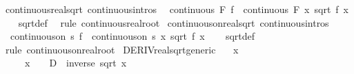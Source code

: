 \begin{isabellebody}
\endisatagproof
{\isafoldproof}%
%
\isadelimproof
\isanewline
%
\endisadelimproof
\isanewline
{}\isamarkupfalse%
\ continuous{\isacharunderscore}{\kern0pt}real{\isacharunderscore}{\kern0pt}sqrt\ {\isacharbrackleft}{\kern0pt}continuous{\isacharunderscore}{\kern0pt}intros{\isacharbrackright}{\kern0pt}{\isacharcolon}{\kern0pt}\isanewline
\ \ {\isachardoublequoteopen}continuous\ F\ f\ {\isasymLongrightarrow}\ continuous\ F\ {\isacharparenleft}{\kern0pt}{\isasymlambda}x{\isachardot}{\kern0pt}\ sqrt\ {\isacharparenleft}{\kern0pt}f\ x{\isacharparenright}{\kern0pt}{\isacharparenright}{\kern0pt}{\isachardoublequoteclose}\isanewline
%
\isadelimproof
\ \ %
\endisadelimproof
%
\isatagproof
{}\isamarkupfalse%
\ sqrt{\isacharunderscore}{\kern0pt}def\ \isamarkupfalse%
\ {\isacharparenleft}{\kern0pt}rule\ continuous{\isacharunderscore}{\kern0pt}real{\isacharunderscore}{\kern0pt}root{\isacharparenright}{\kern0pt}%
\endisatagproof
{\isafoldproof}%
%
\isadelimproof
\isanewline
%
\endisadelimproof
\isanewline
{}\isamarkupfalse%
\ continuous{\isacharunderscore}{\kern0pt}on{\isacharunderscore}{\kern0pt}real{\isacharunderscore}{\kern0pt}sqrt\ {\isacharbrackleft}{\kern0pt}continuous{\isacharunderscore}{\kern0pt}intros{\isacharbrackright}{\kern0pt}{\isacharcolon}{\kern0pt}\isanewline
\ \ {\isachardoublequoteopen}continuous{\isacharunderscore}{\kern0pt}on\ s\ f\ {\isasymLongrightarrow}\ continuous{\isacharunderscore}{\kern0pt}on\ s\ {\isacharparenleft}{\kern0pt}{\isasymlambda}x{\isachardot}{\kern0pt}\ sqrt\ {\isacharparenleft}{\kern0pt}f\ x{\isacharparenright}{\kern0pt}{\isacharparenright}{\kern0pt}{\isachardoublequoteclose}\isanewline
%
\isadelimproof
\ \ %
\endisadelimproof
%
\isatagproof
{}\isamarkupfalse%
\ sqrt{\isacharunderscore}{\kern0pt}def\ \isamarkupfalse%
\ {\isacharparenleft}{\kern0pt}rule\ continuous{\isacharunderscore}{\kern0pt}on{\isacharunderscore}{\kern0pt}real{\isacharunderscore}{\kern0pt}root{\isacharparenright}{\kern0pt}%
\endisatagproof
{\isafoldproof}%
%
\isadelimproof
\isanewline
%
\endisadelimproof
\isanewline
{}\isamarkupfalse%
\ DERIV{\isacharunderscore}{\kern0pt}real{\isacharunderscore}{\kern0pt}sqrt{\isacharunderscore}{\kern0pt}generic{\isacharcolon}{\kern0pt}\isanewline
\ \ \ {\isachardoublequoteopen}x\ {\isasymnoteq}\ {}{\isachardoublequoteclose}\isanewline
\ \ \ \ \ {\isachardoublequoteopen}x\ {\isachargreater}{\kern0pt}\ {}\ {\isasymLongrightarrow}\ D\ {\isacharequal}{\kern0pt}\ inverse\ {\isacharparenleft}{\kern0pt}sqrt\ x{\isacharparenright}{\kern0pt}\ {\isacharslash}{\kern0pt}\ {}{\isachardoublequoteclose}\isanewline

\end{isabellebody}
